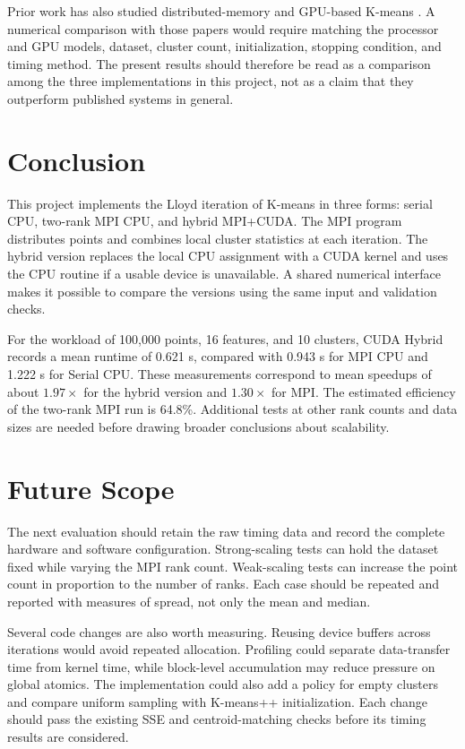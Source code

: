 \documentclass[conference]{IEEEtran}
\begin{document}
Prior work has also studied distributed-memory and GPU-based K-means \cite{dhillon2000,farivar2008,li2013}. A numerical comparison with those papers would require matching the processor and GPU models, dataset, cluster count, initialization, stopping condition, and timing method. The present results should therefore be read as a comparison among the three implementations in this project, not as a claim that they outperform published systems in general.

\section{Conclusion}
\label{sec:conclusion}
This project implements the Lloyd iteration of K-means in three forms: serial CPU, two-rank MPI CPU, and hybrid MPI+CUDA. The MPI program distributes points and combines local cluster statistics at each iteration. The hybrid version replaces the local CPU assignment with a CUDA kernel and uses the CPU routine if a usable device is unavailable. A shared numerical interface makes it possible to compare the versions using the same input and validation checks.

For the workload of 100,000 points, 16 features, and 10 clusters, CUDA Hybrid records a mean runtime of 0.621 s, compared with 0.943 s for MPI CPU and 1.222 s for Serial CPU. These measurements correspond to mean speedups of about $1.97\times$ for the hybrid version and $1.30\times$ for MPI. The estimated efficiency of the two-rank MPI run is 64.8\%. Additional tests at other rank counts and data sizes are needed before drawing broader conclusions about scalability.

\section{Future Scope}
\label{sec:future}
The next evaluation should retain the raw timing data and record the complete hardware and software configuration. Strong-scaling tests can hold the dataset fixed while varying the MPI rank count. Weak-scaling tests can increase the point count in proportion to the number of ranks. Each case should be repeated and reported with measures of spread, not only the mean and median.

Several code changes are also worth measuring. Reusing device buffers across iterations would avoid repeated allocation. Profiling could separate data-transfer time from kernel time, while block-level accumulation may reduce pressure on global atomics. The implementation could also add a policy for empty clusters and compare uniform sampling with K-means++ initialization. Each change should pass the existing SSE and centroid-matching checks before its timing results are considered.
\end{document}
